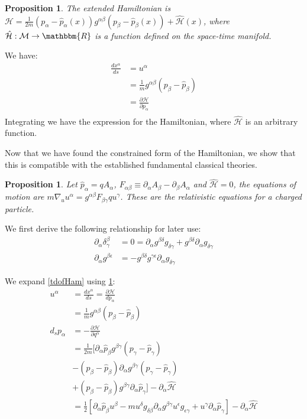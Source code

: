 \documentclass[aps,pra,10pt,twocolumn,floatfix,nofootinbib]{revtex4-1}
\newtheorem{prop}[thm]{Proposition}
\theoremstyle{definition}
\begin{document}
\begin{prop}\label{kineticHamiltonian}
The extended Hamiltonian is $\mathcal{H}=\frac{1}{2m}(p_\alpha-\hat{p}_\alpha(x))g^{\alpha\beta}(p_\beta-\hat{p}_\beta(x))+\hat{\mathcal{H}}(x)$, where $\hat{\mathcal{H}} : \mathcal{M} \rightarrow \mathbbm{R}$ is a function defined on the space-time manifold.
\end{prop}
We have:
\begin{align*}
\frac{dx^\alpha}{ds} &= u^\alpha \\
&= \frac{1}{m}g^{\alpha\beta}(p_\beta-\hat{p}_\beta) \\
&= \frac{\partial \mathcal{H}}{\partial p_\alpha} \\
\end{align*}
Integrating we have the expression for the Hamiltonian, where $\hat{\mathcal{H}}$ is an arbitrary function.

Now that we have found the constrained form of the Hamiltonian, we show that this is compatible with the established fundamental classical theories.

\begin{prop}\label{relativisticEM}
Let $\hat{p}_\alpha = q A_\alpha$, $F_{\alpha \beta} \equiv \partial_\alpha A_\beta - \partial_\beta A_\alpha$ and $\hat{\mathcal{H}} = 0$, the equations of motion are $m \nabla_u u^\alpha = g^{\alpha\beta} F_{\beta \gamma} q u^\gamma$. These are the relativistic equations for a charged particle.
\end{prop}

We first derive the following relationship for later use:
\begin{align*}
\partial_\alpha \delta^\beta_\gamma &= 0 = \partial_\alpha g^{\beta\delta} g_{\delta\gamma} + g^{\beta\delta} \partial_\alpha g_{\delta\gamma}\\
\partial_\alpha g^{\beta\epsilon} &= - g^{\beta\delta} g^{\gamma\epsilon} \partial_\alpha g_{\delta\gamma}
\end{align*}

We expand \ref{tdofHam} using \ref{kineticHamiltonian}:
\begin{align*}
u^\alpha &= \frac{dx^\alpha}{ds} = \frac{\partial \mathcal{H}}{dp_\alpha} \\
&= \frac{1}{m}g^{\alpha\beta}(p_\beta-\hat{p}_\beta) \\
d_s p_\alpha &= - \frac{\partial \mathcal{H}}{\partial q^\alpha} \\
&=\frac{1}{2m}[\partial_\alpha \hat{p}_\beta g^{\beta \gamma} (p_\gamma -\hat{p}_\gamma) \\
 &- (p_\beta -\hat{p}_\beta) \partial_\alpha g^{\beta \gamma} (p_\gamma -\hat{p}_\gamma) \\
 &+ (p_\beta -\hat{p}_\beta) g^{\beta \gamma} \partial_\alpha \hat{p}_\gamma ]- \partial_\alpha \hat{\mathcal{H}} \\
&=\frac{1}{2}[\partial_\alpha \hat{p}_\beta u^\beta
- m u^\delta g_{\delta\beta} \partial_\alpha g^{\beta \gamma} u^\epsilon g_{\epsilon\gamma}
+ u^\gamma \partial_\alpha \hat{p}_\gamma ]- \partial_\alpha \hat{\mathcal{H}}
\end{align*}
\end{document}
